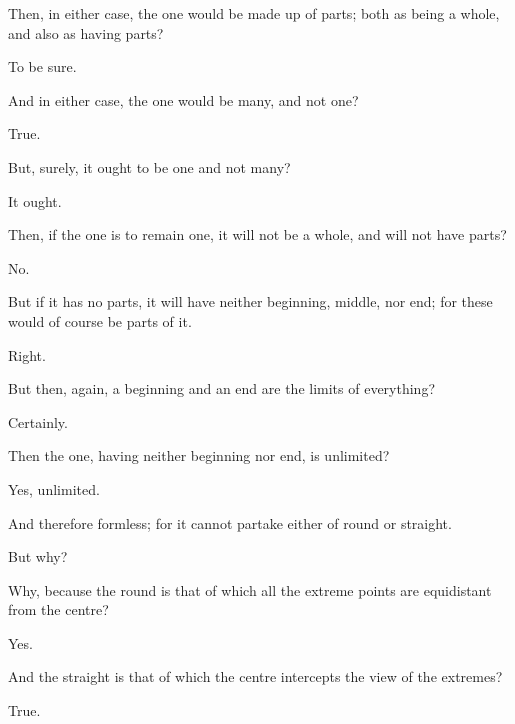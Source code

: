 \documentclass[11pt,letter]{article}
\begin{document}
\par  Then, in either case, the one would be made up of parts; both as being a whole, and also as having parts?

\par  To be sure.

\par  And in either case, the one would be many, and not one?

\par  True.

\par  But, surely, it ought to be one and not many?

\par  It ought.

\par  Then, if the one is to remain one, it will not be a whole, and will not have parts?

\par  No.

\par  But if it has no parts, it will have neither beginning, middle, nor end; for these would of course be parts of it.

\par  Right.

\par  But then, again, a beginning and an end are the limits of everything?

\par  Certainly.

\par  Then the one, having neither beginning nor end, is unlimited?

\par  Yes, unlimited.

\par  And therefore formless; for it cannot partake either of round or straight.

\par  But why?

\par  Why, because the round is that of which all the extreme points are equidistant from the centre?

\par  Yes.

\par  And the straight is that of which the centre intercepts the view of the extremes?

\par  True.
\end{document}
